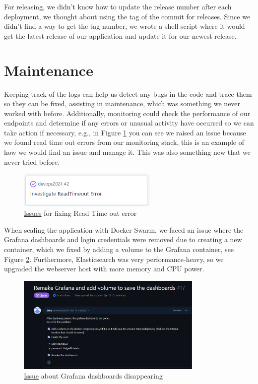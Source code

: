 \documentclass[12pt, a4paper, oneside]{book}
\begin{document}
For releasing, we didn't know how to update the release number after each deployment, we thought about using the tag of the commit for releases. Since we didn't find a way to get the tag number, we wrote a shell script where it would get the latest release of our application and update it for our newest release.

\section{Maintenance}
Keeping track of the logs can help us detect any bugs in the code and trace them so they can be fixed, assisting in maintenance, which was something we never worked with before.
Additionally, monitoring could check the performance of our endpoints and determine if any errors or unusual activity have occurred so we can take action if necessary, e.g., in Figure \ref{fig:github-issues} you can see we raised an issue because we found read time out errors from our monitoring stack, this is an example of how we would find an issue and manage it.
This was also something new that we never tried before.\bigskip

\begin{figure}[H]
    \centering
    \includegraphics[width=0.6\textwidth]{images/issues.png}
    \caption{\href{https://github.com/DevOps2024-Organization/devops2024/issues/2}{Issues} for fixing Read Time out error}
    \label{fig:github-issues}
\end{figure}

When scaling the application with Docker Swarm, we faced an issue where the Grafana dashboards and login credentials were removed due to creating a new container, which we fixed by adding a volume to the Grafana container, see Figure \ref{fig:grafana-issue}.
Furthermore, Elasticsearch was very performance-heavy, so we upgraded the webserver host with more memory and CPU power.

\begin{figure}[H]
    \centering
    \includegraphics[width=0.8\textwidth]{images/grafana-issue.png}
    \caption{\href{https://github.com/DevOps2024-Organization/devops2024/issues/17}{Issue} about Grafana dashboards disappearing}
    \label{fig:grafana-issue}
\end{figure}
\end{document}
